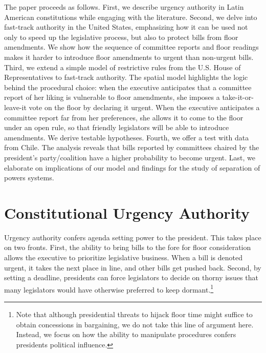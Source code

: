 \documentclass[letter,12pt]{article}
\begin{document}
The paper proceeds as follows. First, we describe urgency authority in Latin American constitutions while engaging with the literature. Second, we delve into fast-track authority in the United States, emphasizing how it can be used not only to speed up the legislative process, but also to protect bills from floor amendments. We show how the sequence of committee reports and floor readings makes it harder to introduce floor amendments to urgent than non-urgent bills. Third, we extend a simple model of restrictive rules from the U.S. House of Representatives to fast-track authority. The spatial model highlights the logic behind the procedural choice: when the executive anticipates that a committee report of her liking is vulnerable to floor amendments, she imposes a take-it-or-leave-it vote on the floor by declaring it urgent. When the executive anticipates a committee report far from her preferences, she allows it to come to the floor under an open rule, so that friendly legislators will be able to introduce amendments. We derive testable hypotheses. Fourth, we offer a test with data from Chile. The analysis reveals that bills reported by committees chaired by the president’s party/coalition have a higher probability to become urgent. Last, we elaborate on implications of our model and findings for the study of separation of powers systems. 


\section*{Constitutional Urgency Authority}

Urgency authority confers agenda setting power to the president. This takes place on two fronts. First, the ability to bring bills to the fore for floor consideration allows the executive to prioritize legislative business. When a bill is denoted urgent, it takes the next place in line, and other bills get pushed back. Second, by setting a deadline, presidents can force legislators to decide on thorny issues that many legislators would have otherwise preferred to keep dormant.\footnote{Note that although presidential threats to hijack floor time might suffice to obtain concessions in bargaining, we do not take this line of argument here. Instead, we focus on how the ability to manipulate procedures confers presidents political influence.} 
\end{document}
